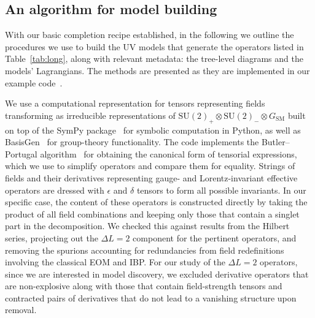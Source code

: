 \subsection{An algorithm for model building}
\label{sec:ch2-algorithm}

With our basic completion recipe established, in the following we outline the
procedures we use to build the UV models that generate the operators listed in
Table~\ref{tab:long}, along with relevant metadata: the tree-level diagrams and
the models' Lagrangians. The methods are presented as they are implemented in
our example code~\cite{neutrinomass2020}.

We use a computational representation for tensors representing fields
transforming as irreducible representations of
$\mathrm{SU}(2)_{+} \otimes \mathrm{SU}(2)_{-} \otimes G_{\text{SM}}$ built on
top of the \textsf{SymPy} package~\cite{10.7717/peerj-cs.103} for symbolic
computation in \textsf{Python}, as well as
\textsf{BasisGen}~\cite{Criado:2019ugp} for group-theory functionality. The code
implements the Butler--Portugal algorithm~\cite{butler1991, MANSSUR_2002} for
obtaining the canonical form of tensorial expressions, which we use to simplify
operators and compare them for equality. Strings of fields and their derivatives
representing gauge- and Lorentz-invariant effective operators are dressed with
$\epsilon$ and $\delta$ tensors to form all possible invariants. In our specific
case, the content of these operators is constructed directly by taking the
product of all field combinations and keeping only those that contain a singlet
part in the decomposition. We checked this against results from the Hilbert
series, projecting out the $\Delta L = 2$ component for the pertinent operators,
and removing the spurions accounting for redundancies from field redefinitions
involving the classical EOM and IBP. For our study of the $\Delta L = 2$
operators, since we are interested in model discovery, we excluded derivative
operators that are non-explosive along with those that contain field-strength
tensors and contracted pairs of derivatives that do not lead to a vanishing
structure upon removal.


